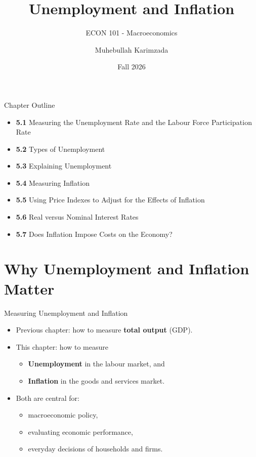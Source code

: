 \documentclass[aspectratio=169]{beamer}
\title{\textbf{Unemployment and Inflation \vspace{.5cm}\\  }}
\subtitle{ {\large ECON 101 - Macroeconomics}}
\author{Muhebullah Karimzada}
\date{Fall 2026}
\begin{document}
\begin{frame}[plain]
  \titlepage
\end{frame}

\begin{frame}{Chapter Outline}
\transfade
\begin{itemize}
  \item \textbf{5.1} Measuring the Unemployment Rate and the Labour Force Participation Rate
  \item \textbf{5.2} Types of Unemployment
  \item \textbf{5.3} Explaining Unemployment
  \item \textbf{5.4} Measuring Inflation
  \item \textbf{5.5} Using Price Indexes to Adjust for the Effects of Inflation
  \item \textbf{5.6} Real versus Nominal Interest Rates
  \item \textbf{5.7} Does Inflation Impose Costs on the Economy?
\end{itemize}
\end{frame}

\section*{Why Unemployment and Inflation Matter}

\begin{frame}{Measuring Unemployment and Inflation}
\transfade
\begin{itemize}
  \item Previous chapter: how to measure \textbf{total output} (GDP).
  \item This chapter: how to measure
  \begin{itemize}
    \item \textbf{Unemployment} in the labour market, and
    \item \textbf{Inflation} in the goods and services market.
  \end{itemize}
  \item Both are central for:
  \begin{itemize}
    \item macroeconomic policy,
    \item evaluating economic performance,
    \item everyday decisions of households and firms.
  \end{itemize}
\end{itemize}
\end{frame}
\end{document}
